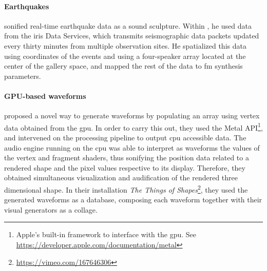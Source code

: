 \documentclass[
]{book}
\begin{document}
\paragraph{Earthquakes}
\textcite{icmc/bbp2372.2017.033} sonified real-time earthquake data as a sound sculpture. Within , he used data from the \gls{iris} Data Services, which transmits seismographic data packets updated every thirty minutes from multiple observation sites. He spatialized this data using coordinates of the events and using a four-speaker array located at the center of the gallery space, and mapped the rest of the data to \gls{fm} synthesis parameters.

\paragraph{GPU-based waveforms}
\textcite{icmc/bbp2372.2016.056} proposed a novel way to generate waveforms by populating an array using vertex data obtained from the \gls{gpu}. In order to carry this out, they used the Metal API\footnote{Apple's built-in framework to interface with the \gls{gpu}. See \url{https://developer.apple.com/documentation/metal}}, and intervened on the processing pipeline to output \gls{cpu} accessible data. The audio engine running on the \gls{cpu} was able to interpret as waveforms the values of the vertex and fragment shaders, thus sonifying the position data related to a rendered shape and the pixel values respective to its display. Therefore, they obtained simultaneous visualization and audification of the rendered three dimensional shape. In their installation \textit{The Things of Shapes}\footnote{\url{https://vimeo.com/167646306}}, they used the generated waveforms as a database, composing each waveform together with their visual generators as a collage.
\end{document}

